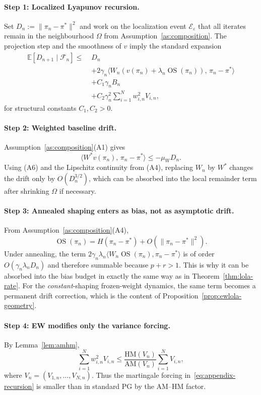 \documentclass{article}
\theoremstyle{plain}
\theoremstyle{definition}
\theoremstyle{remark}
\newcommand{\HM}{\mathrm{HM}}
\newcommand{\AM}{\mathrm{AM}}
\newcommand{\E}{\mathbb{E}}
\DeclareMathOperator{\OS}{OS}
\begin{document}
\paragraph{Step 1: Localized Lyapunov recursion.}
Set $D_n := \|\pi_n-\pi^\ast\|^2$ and work on the localization event $\mathcal{E}_\varepsilon$ that all iterates remain in the neighbourhood $\Omega$ from Assumption~\ref{as:composition}. The projection step and the smoothness of $v$ imply the standard expansion
\begin{equation}\label{eq:appendix-recursion}
\begin{aligned}
\E[D_{n+1}\mid\mathcal{F}_n]
\le\;& D_n\\
&+ 2\gamma_n\langle W_n(v(\pi_n)+\lambda_n\OS(\pi_n)),\,\pi_n-\pi^\ast\rangle\\
&+ C_1\gamma_n B_n\\
&+ C_2\gamma_n^2 \sum_{i=1}^N w_{i,n}^2V_{i,n},
\end{aligned}
\end{equation}
for structural constants $C_1,C_2>0$.

\paragraph{Step 2: Weighted baseline drift.}
Assumption~\ref{as:composition}\textup{(A1)} gives
\[
\langle W^\ast v(\pi_n),\,\pi_n-\pi^\ast\rangle \le -\mu_W D_n.
\]
Using \textup{(A6)} and the Lipschitz continuity from \textup{(A4)}, replacing $W_n$ by $W^\ast$ changes the drift only by $O(D_n^{3/2})$, which can be absorbed into the local remainder term after shrinking $\Omega$ if necessary.

\paragraph{Step 3: Annealed shaping enters as bias, not as asymptotic drift.}
From Assumption~\ref{as:composition}\textup{(A4)},
\[
\OS(\pi_n)=H(\pi_n-\pi^\ast)+O(\|\pi_n-\pi^\ast\|^2).
\]
Under annealing, the term $2\gamma_n\lambda_n\langle W_n\OS(\pi_n),\pi_n-\pi^\ast\rangle$ is of order $O(\gamma_n\lambda_n D_n)$ and therefore summable because $p+r>1$. This is why it can be absorbed into the bias budget in exactly the same way as in Theorem~\ref{thm:lola-rate}. For the \emph{constant}-shaping frozen-weight dynamics, the same term becomes a permanent drift correction, which is the content of Proposition~\ref{prop:ewlola-geometry}.

\paragraph{Step 4: EW modifies only the variance forcing.}
By Lemma~\ref{lem:amhm},
\[
\sum_{i=1}^N w_{i,n}^2V_{i,n}
\le
\frac{\HM(V_n)}{\AM(V_n)} \sum_{i=1}^N V_{i,n},
\]
where $V_n=(V_{1,n},\ldots,V_{N,n})$. Thus the martingale forcing in~\eqref{eq:appendix-recursion} is smaller than in standard PG by the AM--HM factor.
\end{document}
